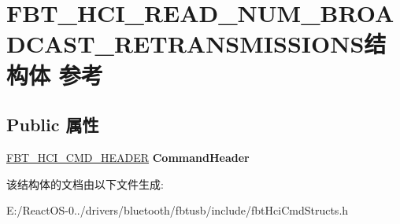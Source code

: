 \hypertarget{struct_f_b_t___h_c_i___r_e_a_d___n_u_m___b_r_o_a_d_c_a_s_t___r_e_t_r_a_n_s_m_i_s_s_i_o_n_s}{}\section{F\+B\+T\+\_\+\+H\+C\+I\+\_\+\+R\+E\+A\+D\+\_\+\+N\+U\+M\+\_\+\+B\+R\+O\+A\+D\+C\+A\+S\+T\+\_\+\+R\+E\+T\+R\+A\+N\+S\+M\+I\+S\+S\+I\+O\+N\+S结构体 参考}
\label{struct_f_b_t___h_c_i___r_e_a_d___n_u_m___b_r_o_a_d_c_a_s_t___r_e_t_r_a_n_s_m_i_s_s_i_o_n_s}
\subsection*{Public 属性}
\begin{DoxyCompactItemize}
\item 
\mbox{\label{struct_f_b_t___h_c_i___r_e_a_d___n_u_m___b_r_o_a_d_c_a_s_t___r_e_t_r_a_n_s_m_i_s_s_i_o_n_s_a43402ab1a1842e8d66c53bda8e9d2d3e}} 
\hyperlink{struct_f_b_t___h_c_i___c_m_d___h_e_a_d_e_r}{F\+B\+T\+\_\+\+H\+C\+I\+\_\+\+C\+M\+D\+\_\+\+H\+E\+A\+D\+ER} {\bfseries Command\+Header}
\end{DoxyCompactItemize}


该结构体的文档由以下文件生成\+:\begin{DoxyCompactItemize}
\item 
E\+:/\+React\+O\+S-\/0../drivers/bluetooth/fbtusb/include/fbt\+Hci\+Cmd\+Structs.\+h\end{DoxyCompactItemize}
